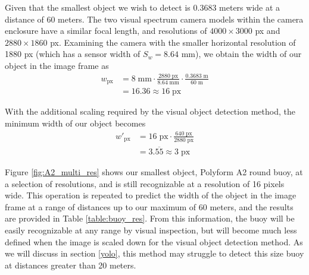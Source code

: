 \documentclass{erauthesis}
\begin{document}
Given that the smallest object we wish to detect is $0.3683$ meters wide at a distance of 60 meters.
The two visual spectrum camera models within the camera enclosure have a similar focal length, and resolutions of $4000 \times 3000$ px and $2880 \times 1860$ px. Examining the camera with the smaller horizontal resolution of 1880 px (which has a sensor width of $S_{w} = 8.64$ mm), we obtain the width of our object in the image frame as
\begin{equation*}
\begin{split}
    \mathit{w}_{\text{px}} & = 8\;\text{mm} \cdot \frac{2880\;\text{px}}{8.64\;\text{mm}} \cdot \frac{0.3683\;\text{m}}{60\;\text{m}}\\
     & = 16.36 \approx 16 \;\text{px}
\end{split}
\end{equation*}

With the additional scaling required by the visual object detection method, the minimum width of our object becomes 
\begin{equation*}
\begin{split}
    \mathit{w}'_{\text{px}} & = 16\;\text{px} \cdot \frac{640\;\text{px}}{2880\;\text{px}} \\
     & = 3.\overline{55} \approx 3 \;\text{px}
\end{split}
\end{equation*}

Figure \ref{fig:A2_multi_res} shows our smallest object, Polyform A2 round buoy, at a selection of resolutions, and is still recognizable at a resolution of 16 pixels wide. %
This operation is repeated to predict the width of the object in the image frame at a range of distances up to our maximum of 60 meters, and the results are provided in Table \ref{table:buoy_res}.
From this information, the buoy will be easily recognizable at any range by visual inspection, but will become much less defined when the image is scaled down for the visual object detection method.
As we will discuss in section \ref{yolo}, this method may struggle to detect this size buoy at distances greater than 20 meters.
\end{document}
